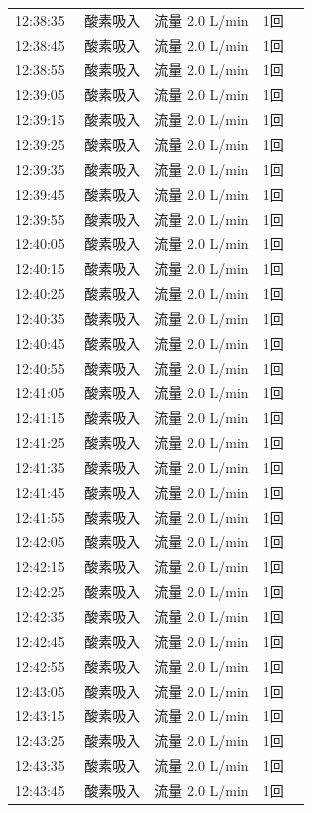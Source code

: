 \documentclass[UTF8,10pt,a4paper,fontset=fandol]{ctexart}
\begin{document}
\begin{minipage}[t]{0.48\linewidth}
\begin{tabular}{@{}p{0.22\linewidth}p{0.72\linewidth}@{}}
12:38:35 & 酸素吸入　流量 2.0 L/min　1回\\
12:38:45 & 酸素吸入　流量 2.0 L/min　1回\\
12:38:55 & 酸素吸入　流量 2.0 L/min　1回\\
12:39:05 & 酸素吸入　流量 2.0 L/min　1回\\
12:39:15 & 酸素吸入　流量 2.0 L/min　1回\\
12:39:25 & 酸素吸入　流量 2.0 L/min　1回\\
12:39:35 & 酸素吸入　流量 2.0 L/min　1回\\
12:39:45 & 酸素吸入　流量 2.0 L/min　1回\\
12:39:55 & 酸素吸入　流量 2.0 L/min　1回\\
12:40:05 & 酸素吸入　流量 2.0 L/min　1回\\
12:40:15 & 酸素吸入　流量 2.0 L/min　1回\\
12:40:25 & 酸素吸入　流量 2.0 L/min　1回\\
12:40:35 & 酸素吸入　流量 2.0 L/min　1回\\
12:40:45 & 酸素吸入　流量 2.0 L/min　1回\\
12:40:55 & 酸素吸入　流量 2.0 L/min　1回\\
12:41:05 & 酸素吸入　流量 2.0 L/min　1回\\
12:41:15 & 酸素吸入　流量 2.0 L/min　1回\\
12:41:25 & 酸素吸入　流量 2.0 L/min　1回\\
12:41:35 & 酸素吸入　流量 2.0 L/min　1回\\
12:41:45 & 酸素吸入　流量 2.0 L/min　1回\\
12:41:55 & 酸素吸入　流量 2.0 L/min　1回\\
12:42:05 & 酸素吸入　流量 2.0 L/min　1回\\
12:42:15 & 酸素吸入　流量 2.0 L/min　1回\\
12:42:25 & 酸素吸入　流量 2.0 L/min　1回\\
12:42:35 & 酸素吸入　流量 2.0 L/min　1回\\
12:42:45 & 酸素吸入　流量 2.0 L/min　1回\\
12:42:55 & 酸素吸入　流量 2.0 L/min　1回\\
12:43:05 & 酸素吸入　流量 2.0 L/min　1回\\
12:43:15 & 酸素吸入　流量 2.0 L/min　1回\\
12:43:25 & 酸素吸入　流量 2.0 L/min　1回\\
12:43:35 & 酸素吸入　流量 2.0 L/min　1回\\
12:43:45 & 酸素吸入　流量 2.0 L/min　1回\\

\end{tabular}
\end{minipage}
\end{document}
